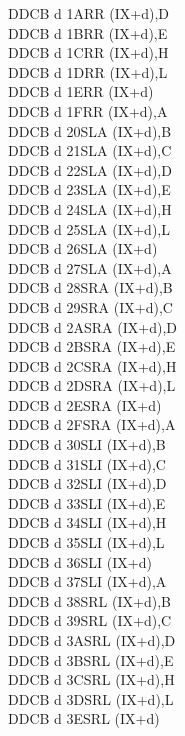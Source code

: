 \begin{multicols}{3}
{\begin{tabbing}
	DDCB d 1A\>RR (IX+d),D\UNDOC\\
	DDCB d 1B\>RR (IX+d),E\UNDOC\\
	DDCB d 1C\>RR (IX+d),H\UNDOC\\
	DDCB d 1D\>RR (IX+d),L\UNDOC\\
	DDCB d 1E\>RR (IX+d)\\
	DDCB d 1F\>RR (IX+d),A\UNDOC\\
	DDCB d 20\>SLA (IX+d),B\UNDOC\\
	DDCB d 21\>SLA (IX+d),C\UNDOC\\
	DDCB d 22\>SLA (IX+d),D\UNDOC\\
	DDCB d 23\>SLA (IX+d),E\UNDOC\\
	DDCB d 24\>SLA (IX+d),H\UNDOC\\
	DDCB d 25\>SLA (IX+d),L\UNDOC\\
	DDCB d 26\>SLA (IX+d)\\
	DDCB d 27\>SLA (IX+d),A\UNDOC\\
	DDCB d 28\>SRA (IX+d),B\UNDOC\\
	DDCB d 29\>SRA (IX+d),C\UNDOC\\
	DDCB d 2A\>SRA (IX+d),D\UNDOC\\
	DDCB d 2B\>SRA (IX+d),E\UNDOC\\
	DDCB d 2C\>SRA (IX+d),H\UNDOC\\
	DDCB d 2D\>SRA (IX+d),L\UNDOC\\
	DDCB d 2E\>SRA (IX+d)\\
	DDCB d 2F\>SRA (IX+d),A\UNDOC\\
	DDCB d 30\>SLI (IX+d),B\UNDOC\\
	DDCB d 31\>SLI (IX+d),C\UNDOC\\
	DDCB d 32\>SLI (IX+d),D\UNDOC\\
	DDCB d 33\>SLI (IX+d),E\UNDOC\\
	DDCB d 34\>SLI (IX+d),H\UNDOC\\
	DDCB d 35\>SLI (IX+d),L\UNDOC\\
	DDCB d 36\>SLI (IX+d)\UNDOC\\
	DDCB d 37\>SLI (IX+d),A\UNDOC\\
	DDCB d 38\>SRL (IX+d),B\UNDOC\\
	DDCB d 39\>SRL (IX+d),C\UNDOC\\
	DDCB d 3A\>SRL (IX+d),D\UNDOC\\
	DDCB d 3B\>SRL (IX+d),E\UNDOC\\
	DDCB d 3C\>SRL (IX+d),H\UNDOC\\
	DDCB d 3D\>SRL (IX+d),L\UNDOC\\
	DDCB d 3E\>SRL (IX+d)\\

\end{tabbing}}
\end{multicols}
